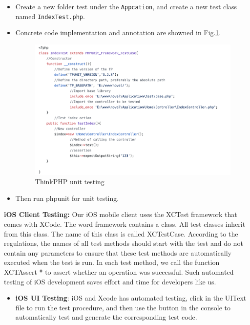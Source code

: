 \begin{itemize}
    \item Create a new folder test under the \texttt{Appcation}, and create a new test class named \texttt{IndexTest.php}.
    \item Concrete code implementation and annotation are showned in Fig.\ref{php}.
  
   \begin{figure}[H]
  \centering
  \includegraphics[width=.8\textwidth]{php.png} %
  \caption{ThinkPHP unit testing}
  \label{php} %
 \end{figure}
    
     \item Then run phpunit for unit testing.
\end{itemize}



\vspace{0.3cm}
\noindent \textbf{iOS Client Testing:}
\vspace{0.3cm}
\newline \noindent Our iOS mobile client uses the XCTest framework that comes with XCode. The word framework contains a class. All test classes inherit from this class. The name of this class is called XCTestCase. According to the regulations, the names of all test methods should start with the test and do not contain any parameters to ensure that these test methods are automatically executed when the test is run. In each test method, we call the function XCTAssert * to assert whether an operation was successful. Such automated testing of iOS development saves effort and time for developers like us.
  \begin{itemize}
      \item \textbf{iOS UI Testing}: iOS and Xcode has automated testing, click  in the UIText file to run the test procedure, and then use the  button in the console to automatically test and generate the corresponding test code.
  \end{itemize}
